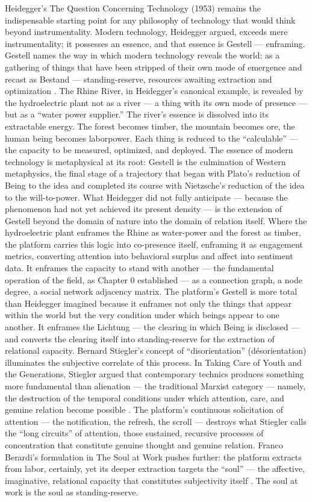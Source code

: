 Heidegger’s The Question Concerning Technology (1953) remains the indispensable starting point for any philosophy of technology that would think beyond instrumentality. Modern technology, Heidegger argued, exceeds mere instrumentality; it possesses an essence, and that essence is Gestell — enframing. Gestell names the way in which modern technology reveals the world: as a gathering of things that have been stripped of their own mode of emergence and recast as Bestand — standing-reserve, resources awaiting extraction and optimization \cite[pp.~3--35]{heidegger_1977}. The Rhine River, in Heidegger’s canonical example, is revealed by the hydroelectric plant not as a river — a thing with its own mode of presence — but as a “water power supplier.” The river’s essence is dissolved into its extractable energy. The forest becomes timber, the mountain becomes ore, the human being becomes laborpower. Each thing is reduced to the “calculable” — the capacity to be measured, optimized, and deployed. The essence of modern technology is metaphysical at its root: Gestell is the culmination of Western metaphysics, the final stage of a trajectory that began with Plato’s reduction of Being to the idea and completed its course with Nietzsche’s reduction of the idea to the will-to-power. What Heidegger did not fully anticipate — because the phenomenon had not yet achieved its present density — is the extension of Gestell beyond the domain of nature into the domain of relation itself. Where the hydroelectric plant enframes the Rhine as water-power and the forest as timber, the platform carries this logic into co-presence itself, enframing it as engagement metrics, converting attention into behavioral surplus and affect into sentiment data. It enframes the capacity to stand with another — the fundamental operation of the field, as Chapter 0 established — as a connection graph, a node degree, a social network adjacency matrix. The platform’s Gestell is more total than Heidegger imagined because it enframes not only the things that appear within the world but the very condition under which beings appear to one another. It enframes the Lichtung — the clearing in which Being is disclosed — and converts the clearing itself into standing-reserve for the extraction of relational capacity. Bernard Stiegler’s concept of “disorientation” (désorientation) illuminates the subjective correlate of this process. In Taking Care of Youth and the Generations, Stiegler argued that contemporary technics produces something more fundamental than alienation — the traditional Marxist category — namely, the destruction of the temporal conditions under which attention, care, and genuine relation become possible \cite{stiegler_2010}. The platform’s continuous solicitation of attention — the notification, the refresh, the scroll — destroys what Stiegler calls the “long circuits” of attention, those sustained, recursive processes of concentration that constitute genuine thought and genuine relation. Franco Berardi’s formulation in The Soul at Work pushes further: the platform extracts from labor, certainly, yet its deeper extraction targets the “soul” — the affective, imaginative, relational capacity that constitutes subjectivity itself \cite{berardi_2009}. The soul at work is the soul as standing-reserve.

